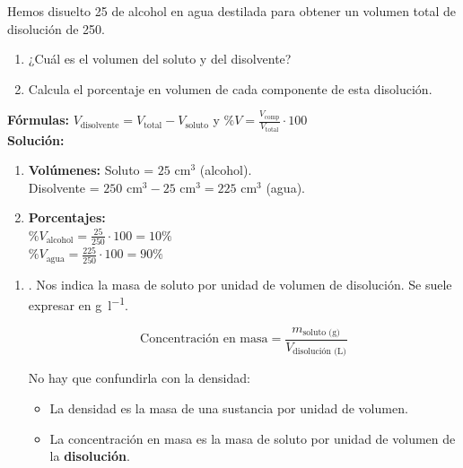 \begin{exercise}
    Hemos disuelto \qty{25}{\cmcubicos} de alcohol en agua destilada para obtener un volumen total de disolución de \qty{250}{\cmcubicos}.
    \begin{enumerate}[label=\letraminuscula]
        \item ¿Cuál es el volumen del soluto y del disolvente?
        \item Calcula el porcentaje en volumen de cada componente de esta disolución.
    \end{enumerate}
    \begin{solu}
        \textbf{Fórmulas:} $V_{\text{disolvente}} = V_{\text{total}} - V_{\text{soluto}}$ y $\%V = \frac{V_{\text{comp}}}{V_{\text{total}}} \cdot 100$ \\
        \textbf{Solución:}
        \begin{enumerate}[label=\alph*)]
            \item \textbf{Volúmenes:} Soluto = $25 \text{ cm}^3$ (alcohol). \\
            Disolvente = $250 \text{ cm}^3 - 25 \text{ cm}^3 = 225 \text{ cm}^3$ (agua).
            \item \textbf{Porcentajes:} \\
            $\%V_{\text{alcohol}} = \frac{25}{250} \cdot 100 = 10\%$ \\
            $\%V_{\text{agua}} = \frac{225}{250} \cdot 100 = 90\%$
        \end{enumerate}
    \end{solu}
\end{exercise}


\begin{enumerate}[label=\numberballmDarkTeal,resume]
\item {}.
Nos indica la masa de soluto por unidad de volumen de disolución.
Se suele expresar en \unit{\g\per\litre}.

\begin{equation*}
    \text{Concentración en masa} = \dfrac{m_{\text{soluto (g)}}}{V_{\text{disolución (L)}}}
\end{equation*}

No hay que confundirla con la densidad:
\begin{itemize}
    \item La densidad es la masa de una sustancia por unidad de volumen.
    \item La concentración en masa es la masa de soluto por unidad de volumen de la \textbf{disolución}.
\end{itemize}
\end{enumerate}

